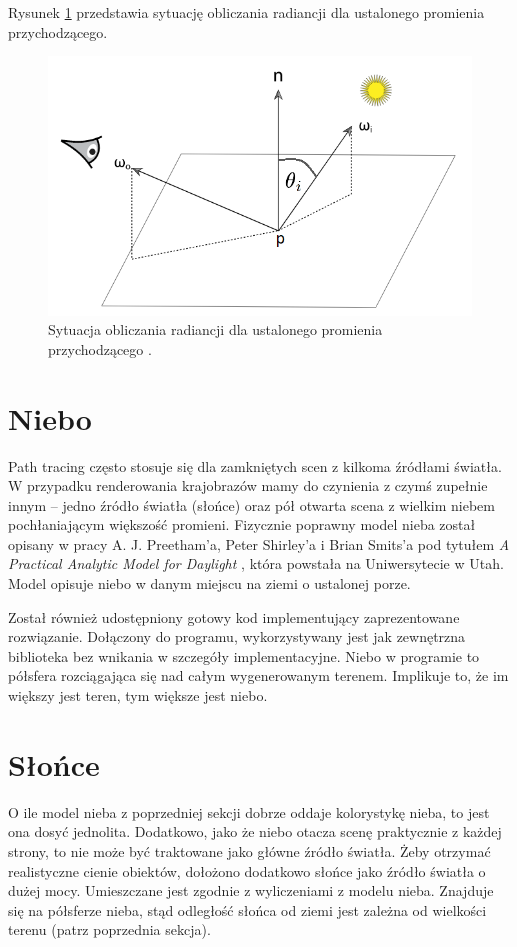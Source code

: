\documentclass[inz,shortabstract]{iithesis}
\begin{document}
        Rysunek \ref{fig:renderingEquation} przedstawia sytuację obliczania radiancji dla ustalonego promienia przychodzącego.
        
        \begin{figure}[H]
            \includegraphics[width=\linewidth]{renderingEquation.png}
            \caption{Sytuacja obliczania radiancji dla ustalonego promienia przychodzącego \cite{pbrt}.} 
            \label{fig:renderingEquation}
        \end{figure}
        
    \section{Niebo}
        Path tracing często stosuje się dla zamkniętych scen z kilkoma źródłami światła. W przypadku renderowania krajobrazów mamy do czynienia z czymś zupełnie innym -- jedno źródło światła (słońce) oraz pół otwarta scena z wielkim niebem pochłaniającym większość promieni. Fizycznie poprawny model nieba został opisany w pracy  A. J. Preetham'a, 
        Peter Shirley'a i Brian Smits'a pod tytułem \textit{A Practical Analytic Model for Daylight} \cite{sky}, która powstała na Uniwersytecie w Utah. Model opisuje niebo w danym miejscu na ziemi o ustalonej porze. 
        
        Został również udostępniony gotowy kod implementujący zaprezentowane rozwiązanie. Dołączony do programu, wykorzystywany jest jak zewnętrzna biblioteka bez wnikania w szczegóły implementacyjne. Niebo w programie to półsfera rozciągająca się nad całym wygenerowanym terenem. Implikuje to, że im większy jest teren, tym większe jest niebo.
    
    \section{Słońce}
        O ile model nieba z poprzedniej sekcji dobrze oddaje kolorystykę nieba, to jest ona dosyć jednolita. Dodatkowo, jako że niebo otacza scenę praktycznie z każdej strony, to nie może być traktowane jako główne źródło światła. Żeby otrzymać realistyczne cienie obiektów, dołożono dodatkowo słońce jako źródło światła o dużej mocy. Umieszczane jest zgodnie z wyliczeniami z modelu nieba. Znajduje się na półsferze nieba, stąd odległość słońca od ziemi jest zależna od wielkości terenu (patrz poprzednia sekcja).
        
\end{document}
